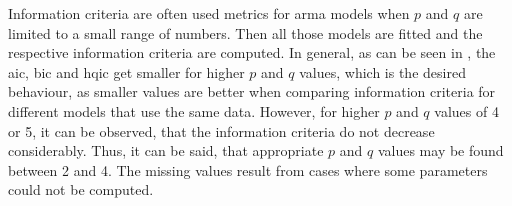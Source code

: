 Information criteria are often used metrics for \gls{arma} models when $p$ and $q$ are limited to a small range of numbers. Then all those models are fitted and the respective information criteria are computed. In general, as can be seen in , the \gls{aic}, \gls{bic} and \gls{hqic} get smaller for higher $p$ and $q$ values, which is the desired behaviour, as smaller values are better when comparing information criteria for different models that use the same data. However, for higher $p$ and $q$ values of 4 or 5, it can be observed, that the information criteria do not decrease considerably. Thus, it can be said, that appropriate $p$ and $q$ values may be found between 2 and 4. The missing values result from cases where some parameters could not be computed.\\

